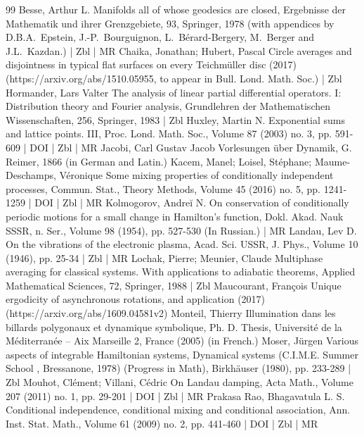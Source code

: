\begin{thebibliography}{99}
Besse, Arthur L. Manifolds all of whose geodesics are closed, Ergebnisse der Mathematik und ihrer Grenzgebiete, 93, Springer, 1978 (with appendices by D.B.A. Epstein, J.-P. Bourguignon, L. Bérard-Bergery, M. Berger and J.L. Kazdan.) | Zbl | MR
Chaika, Jonathan; Hubert, Pascal Circle averages and disjointness in typical flat surfaces on every Teichmüller disc (2017) (https://arxiv.org/abs/1510.05955, to appear in Bull. Lond. Math. Soc.) | Zbl
Hormander, Lars Valter The analysis of linear partial differential operators. I: Distribution theory and Fourier analysis, Grundlehren der Mathematischen Wissenschaften, 256, Springer, 1983 | Zbl
Huxley, Martin N. Exponential sums and lattice points. III, Proc. Lond. Math. Soc., Volume 87 (2003) no. 3, pp. 591-609 | DOI | Zbl | MR
Jacobi, Carl Gustav Jacob Vorlesungen über Dynamik, G. Reimer, 1866 (in German and Latin.)
Kacem, Manel; Loisel, Stéphane; Maume-Deschamps, Véronique Some mixing properties of conditionally independent processes, Commun. Stat., Theory Methods, Volume 45 (2016) no. 5, pp. 1241-1259 | DOI | Zbl | MR
Kolmogorov, Andreĭ N. On conservation of conditionally periodic motions for a small change in Hamilton’s function, Dokl. Akad. Nauk SSSR, n. Ser., Volume 98 (1954), pp. 527-530 (In Russian.) | MR
Landau, Lev D. On the vibrations of the electronic plasma, Acad. Sci. USSR, J. Phys., Volume 10 (1946), pp. 25-34 | Zbl | MR
Lochak, Pierre; Meunier, Claude Multiphase averaging for classical systems. With applications to adiabatic theorems, Applied Mathematical Sciences, 72, Springer, 1988 | Zbl
Maucourant, François Unique ergodicity of asynchronous rotations, and application (2017) (https://arxiv.org/abs/1609.04581v2)
Monteil, Thierry Illumination dans les billards polygonaux et dynamique symbolique, Ph. D. Thesis, Université de la Méditerranée – Aix Marseille 2, France (2005) (in French.)
Moser, Jürgen Various aspects of integrable Hamiltonian systems, Dynamical systems (C.I.M.E. Summer School , Bressanone, 1978) (Progress in Math), Birkhäuser (1980), pp. 233-289 | Zbl
Mouhot, Clément; Villani, Cédric On Landau damping, Acta Math., Volume 207 (2011) no. 1, pp. 29-201 | DOI | Zbl | MR
Prakasa Rao, Bhagavatula L. S. Conditional independence, conditional mixing and conditional association, Ann. Inst. Stat. Math., Volume 61 (2009) no. 2, pp. 441-460 | DOI | Zbl | MR

\end{thebibliography}
